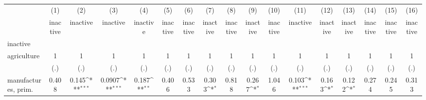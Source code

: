 {
\def\sym#1{\ifmmode^{#1}\else\(^{#1}\)\fi}
\begin{tabular}{l*{16}{c}}
\hline\hline
                    &\multicolumn{1}{c}{(1)}&\multicolumn{1}{c}{(2)}&\multicolumn{1}{c}{(3)}&\multicolumn{1}{c}{(4)}&\multicolumn{1}{c}{(5)}&\multicolumn{1}{c}{(6)}&\multicolumn{1}{c}{(7)}&\multicolumn{1}{c}{(8)}&\multicolumn{1}{c}{(9)}&\multicolumn{1}{c}{(10)}&\multicolumn{1}{c}{(11)}&\multicolumn{1}{c}{(12)}&\multicolumn{1}{c}{(13)}&\multicolumn{1}{c}{(14)}&\multicolumn{1}{c}{(15)}&\multicolumn{1}{c}{(16)}\\
                    &\multicolumn{1}{c}{inactive}&\multicolumn{1}{c}{inactive}&\multicolumn{1}{c}{inactive}&\multicolumn{1}{c}{inactive}&\multicolumn{1}{c}{inactive}&\multicolumn{1}{c}{inactive}&\multicolumn{1}{c}{inactive}&\multicolumn{1}{c}{inactive}&\multicolumn{1}{c}{inactive}&\multicolumn{1}{c}{inactive}&\multicolumn{1}{c}{inactive}&\multicolumn{1}{c}{inactive}&\multicolumn{1}{c}{inactive}&\multicolumn{1}{c}{inactive}&\multicolumn{1}{c}{inactive}&\multicolumn{1}{c}{inactive}\\
\hline
inactive            &                     &                     &                     &                     &                     &                     &                     &                     &                     &                     &                     &                     &                     &                     &                     &                     \\
agriculture         &           1         &           1         &           1         &           1         &           1         &           1         &           1         &           1         &           1         &           1         &           1         &           1         &           1         &           1         &           1         &           1         \\
                    &         (.)         &         (.)         &         (.)         &         (.)         &         (.)         &         (.)         &         (.)         &         (.)         &         (.)         &         (.)         &         (.)         &         (.)         &         (.)         &         (.)         &         (.)         &         (.)         \\
[1em]
manufactures, prim. &       0.408         &       0.145\sym{***}&      0.0907\sym{***}&       0.187\sym{**} &       0.406         &       0.533         &       0.303\sym{*}  &       0.818         &       0.267\sym{*}  &       1.046         &       0.103\sym{***}&       0.163\sym{*}  &       0.122\sym{*}  &       0.274         &       0.245         &       0.313         \\

\end{tabular}}

